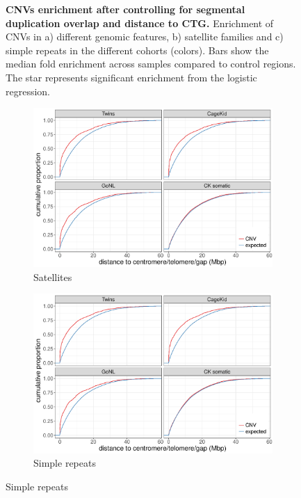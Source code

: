 \begin{figure}[htp]
\begin{subfigure}{.48\textwidth}
    \caption{}
    \label{fig:repSR}
  \end{subfigure}
  \caption[CNVs enrichment after controlling for segmental duplication overlap and distance to CTG.]{{\bf CNVs enrichment after controlling for segmental duplication overlap and distance to CTG.} {\small Enrichment of CNVs in a) different genomic features, b) satellite families and c) simple repeats in the different cohorts (colors). Bars show the median fold enrichment across samples compared to control regions. The star represents significant enrichment from the logistic regression.}}
\end{figure}

\begin{figure}[htp]
  \centering
  \begin{subfigure}{.48\textwidth}
    \includegraphics[width=\textwidth,page=5]{figures/PopSV-repeatEnr.pdf}
    \caption{Satellites}
  \end{subfigure}
  \begin{subfigure}{.48\textwidth}
    \includegraphics[width=\textwidth,page=7]{figures/PopSV-repeatEnr.pdf}
    \caption{Simple repeats}
  \end{subfigure}


\end{figure}
